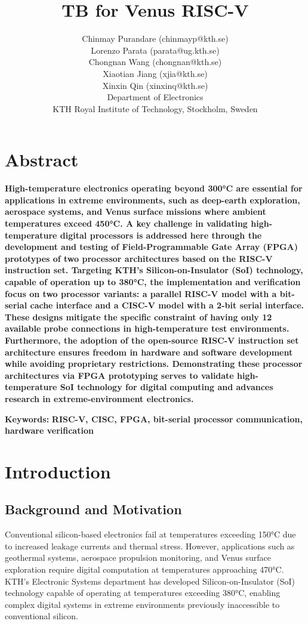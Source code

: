 \documentclass[10pt,twocolumn]{article}
\title{\textbf{TB for Venus RISC-V}\\[0.5em]}
\author{
Chinmay Purandare (chinmayp@kth.se)\\
Lorenzo Parata (parata@ug.kth.se)\\
Chongnan Wang (chongnan@kth.se)\\
Xiaotian Jiang (xjia@kth.se)\\
Xinxin Qin (xinxinq@kth.se)\\
Department of Electronics\\
KTH Royal Institute of Technology, Stockholm, Sweden\\
}
\date{}
\begin{document}
\maketitle

\section*{Abstract}
{
\bfseries
High-temperature electronics operating beyond 300°C are essential for applications in extreme environments, such as deep-earth exploration, aerospace systems, and Venus surface missions where ambient temperatures exceed 450°C. 
A key challenge in validating high-temperature digital processors is addressed here through the development and testing of Field-Programmable Gate Array (FPGA) prototypes of two processor architectures based on the RISC-V instruction set. 
Targeting KTH's Silicon-on-Insulator (SoI) technology, capable of operation up to 380°C, the implementation and verification focus on two processor variants: a parallel RISC-V model with a bit-serial cache interface and a CISC-V model with a 2-bit serial interface. 
These designs mitigate the specific constraint of having only 12 available probe connections in high-temperature test environments. 
Furthermore, the adoption of the open-source RISC-V instruction set architecture ensures freedom in hardware and software development while avoiding proprietary restrictions. 
Demonstrating these processor architectures via FPGA prototyping serves to validate high-temperature SoI technology for digital computing and advances research in extreme-environment electronics.
}

\vspace{1em} %
\noindent \textbf{Keywords:} \textbf{RISC-V, CISC, FPGA, bit-serial processor communication, hardware verification}

\section{Introduction}
\subsection{Background and Motivation}
Conventional silicon-based electronics fail at temperatures exceeding 150°C due to increased leakage currents and thermal stress. However, applications such as geothermal systems, aerospace propulsion monitoring, and Venus surface exploration require digital computation at temperatures approaching 470°C. KTH's Electronic Systems department has developed Silicon-on-Insulator (SoI) technology capable of operating at temperatures exceeding 380°C, enabling complex digital systems in extreme environments previously inaccessible to conventional silicon.
\end{document}

